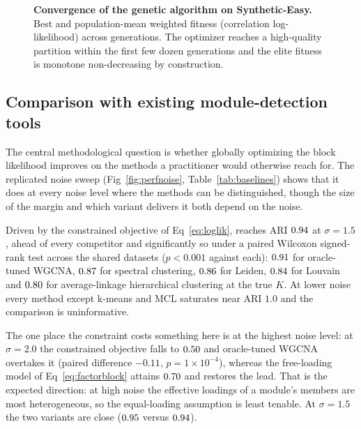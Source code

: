 \begin{figure}[!h]
\caption{\textbf{Convergence of the genetic algorithm on Synthetic-Easy.}
Best and population-mean weighted fitness (correlation log-likelihood) across
generations. The optimizer reaches a high-quality partition within the first few
dozen generations and the elite fitness is monotone non-decreasing by
construction.}
\label{fig:convergence}
\end{figure}

\subsection*{Comparison with existing module-detection tools}
The central methodological question is whether globally optimizing the block
likelihood improves on the methods a practitioner would otherwise reach for. The
replicated noise sweep (Fig~\ref{fig:perfnoise}, Table~\ref{tab:baselines}) shows
that it does at every noise level where the methods can be distinguished, though the size of the margin and which
variant delivers it both depend on the noise.

Driven by the constrained objective of Eq~\eqref{eq:loglik}, \tool{} reaches ARI
$0.94{}$ at $\sigma=1.5$, ahead of every competitor and significantly
so under a paired Wilcoxon signed-rank test across the \NSeeds{} shared datasets
($p<0.001$ against each): $0.91{}$ for oracle-tuned WGCNA,
$0.87{}$ for spectral clustering, $0.86{}$ for Leiden,
$0.84{}$ for Louvain and $0.80{}$ for average-linkage
hierarchical clustering at the true $K$. At lower noise every method except
k-means and MCL saturates near ARI $1.0$ and the comparison is uninformative.

The one place the constraint costs something here is at the highest noise level:
at $\sigma=2.0$ the constrained objective falls to $0.50{}$ and
oracle-tuned WGCNA overtakes it (paired difference $-0.11$, $p=1\times10^{-4}$),
whereas the free-loading model of Eq~\eqref{eq:factorblock} attains
$0.70{}$ and restores the lead. That is the expected direction:
at high noise the effective loadings of a module's members are most
heterogeneous, so the equal-loading assumption is least tenable. At $\sigma=1.5$
the two variants are close ($0.95{}$ versus $0.94{}$).

